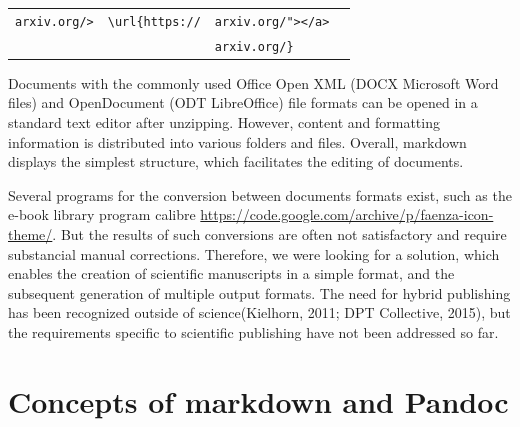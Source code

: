 \documentclass[10pt,fleqn]{wlpeerj}
\begin{document}
\begin{longtable}[]{@{}llll@{}}
\begin{minipage}[t]{0.18\columnwidth}
\texttt{arxiv.org/\textgreater{}}\strut
\end{minipage}
&
\begin{minipage}[t]{0.25\columnwidth}\raggedright\strut
\texttt{\textbackslash{}url\{https://}\strut
\end{minipage}
&
\begin{minipage}[t]{0.26\columnwidth}\raggedright\strut
\texttt{arxiv.org/"\textgreater{}\textless{}/a\textgreater{}}\strut
\end{minipage}\tabularnewline
\begin{minipage}[t]{0.20\columnwidth}\raggedright\strut
\strut
\end{minipage}
&
\begin{minipage}[t]{0.18\columnwidth}\raggedright\strut
\strut
\end{minipage}
&
\begin{minipage}[t]{0.25\columnwidth}\raggedright\strut
\texttt{arxiv.org/\}}\strut
\end{minipage}
&
\begin{minipage}[t]{0.26\columnwidth}\raggedright\strut
\strut
\end{minipage}\tabularnewline
\bottomrule
\end{longtable}

Documents
with
the
commonly
used
Office
Open
XML
(DOCX
Microsoft
Word
files)
and
OpenDocument
(ODT
LibreOffice)
file
formats
can
be
opened
in a
standard
text
editor
after
unzipping.
However,
content
and
formatting
information
is
distributed
into
various
folders
and
files.
Overall,
markdown
displays
the
simplest
structure,
which
facilitates
the
editing
of
documents.

Several
programs
for
the
conversion
between
documents
formats
exist,
such
as
the
e-book
library
program
calibre
\url{https://code.google.com/archive/p/faenza-icon-theme/}.
But
the
results
of
such
conversions
are
often
not
satisfactory
and
require
substancial
manual
corrections.
Therefore,
we
were
looking
for a
solution,
which
enables
the
creation
of
scientific
manuscripts
in a
simple
format,
and
the
subsequent
generation
of
multiple
output
formats.
The
need
for
hybrid
publishing
has
been
recognized
outside
of
science(Kielhorn,
2011;
DPT
Collective,
2015),
but
the
requirements
specific
to
scientific
publishing
have
not
been
addressed
so
far.

\section{Concepts
of
markdown
and
Pandoc}\label{concepts-of-markdown-and-pandoc}
\end{document}
